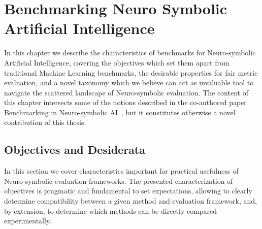 \chapter{Benchmarking Neuro Symbolic Artificial Intelligence}
\label{chap:benchnesy}

In this chapter we describe the characteristics of benchmarks for Neuro-symbolic Artificial Intelligence, covering the objectives which set them apart from traditional Machine Learning benchmarks, the desirable properties for fair metric evaluation, and a novel taxonomy which we believe can act as invaluable tool to navigate the scattered landscape of Neuro-symbolic evaluation.
%
The content of this chapter intersects some of the notions described in the co-authored paper Benchmarking in Neuro-symbolic AI~\cite{manhaeve2024benchmarking}, but it constitutes otherwise a novel contribution of this thesis.

\section{Objectives and Desiderata}\label{bench:sec:objectives}
In this section we cover characteristics important for practical usefulness of Neuro-symbolic evaluation frameworks.
%
The presented characterization of objectives is pragmatic and fundamental to set expectations, allowing to clearly determine compatibility between a given method and evaluation framework, and, by extension, to determine which methods can be directly compared experimentally.

